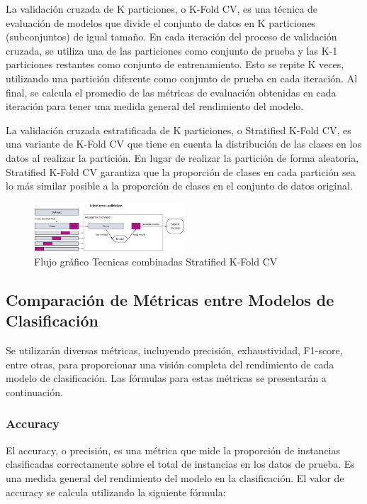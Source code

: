 La validación cruzada de K particiones, o K-Fold CV, es una técnica de evaluación de modelos que divide el conjunto de datos en K particiones (subconjuntos) de igual tamaño. En cada iteración del proceso de validación cruzada, se utiliza una de las particiones como conjunto de prueba y las K-1 particiones restantes como conjunto de entrenamiento. Esto se repite K veces, utilizando una partición diferente como conjunto de prueba en cada iteración. Al final, se calcula el promedio de las métricas de evaluación obtenidas en cada iteración para tener una medida general del rendimiento del modelo.

La validación cruzada estratificada de K particiones, o Stratified K-Fold CV, es una variante de K-Fold CV que tiene en cuenta la distribución de las clases en los datos al realizar la partición. En lugar de realizar la partición de forma aleatoria, Stratified K-Fold CV garantiza que la proporción de clases en cada partición sea lo más similar posible a la proporción de clases en el conjunto de datos original.

\begin{figure}[H]
  \centering
  \includegraphics[width=0.5\textwidth]{img/analisis de metodologia/463627_1_En_8_Fig8_HTML.jpg}
  \caption{Flujo gráfico Tecnicas combinadas Stratified K-Fold CV}
  \label{fig:flujo_kfoldcvstratfield}
\end{figure}

\subsection{Comparación de Métricas entre Modelos de Clasificación}

Se utilizarán diversas métricas, incluyendo precisión, exhaustividad, F1-score, entre otras, para proporcionar una visión completa del rendimiento de cada modelo de clasificación. Las fórmulas para estas métricas se presentarán a continuación.

\subsubsection{Accuracy}
El accuracy, o precisión, es una métrica que mide la proporción de instancias clasificadas correctamente sobre el total de instancias en los datos de prueba. Es una medida general del rendimiento del modelo en la clasificación. El valor de accuracy se calcula utilizando la siguiente fórmula:

